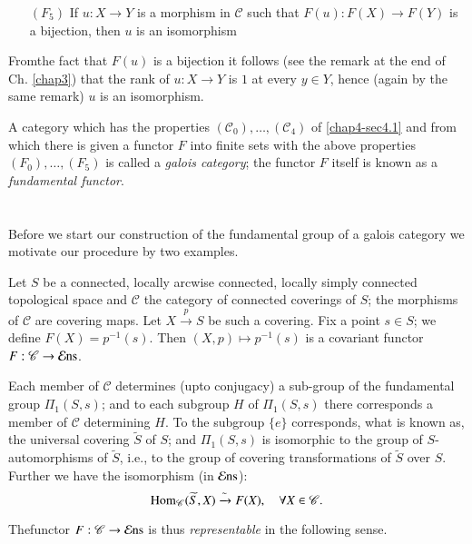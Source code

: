 \begin{itemize}
\item[$(F_{5})$] If $u:X\to Y$ is a morphism in $\mathscr{C}$ such
  that $F(u):F(X)\to F(Y)$ is a bijection, then $u$ is an isomorphism
\end{itemize}

From\pageoriginale the fact that $F(u)$ is a bijection it follows (see
the remark at the end of Ch. \ref{chap3}) that the rank of $u:X\to Y$ is $1$
at every $y\in Y$, hence (again by the same remark) $u$ is an
isomorphism.

A category which has the properties
$(\mathscr{C}_{0}),\ldots,(\mathscr{C}_{4})$ of \ref{chap4-sec4.1} and from
which there is given a functor $F$ into finite sets with the above
properties $(F_{0}),\ldots, (F_{5})$ is called a {\em galois
  category}; the functor $F$ itself is known as a {\em fundamental
  functor}. 

\section{}\label{chap4-sec4.3}
Before we start our construction of the fundamental group of a galois
category we motivate our procedure by two examples.

\begin{exam}\label{chap4-exam1}
Let $S$ be a connected, locally arcwise connected, locally simply
connected topological space and $\mathscr{C}$ the category of
connected coverings of $S$; the morphisms of $\mathscr{C}$ are
covering maps. Let $X\xrightarrow{p}S$ be such a covering. Fix a point
$s\in S$; we define $F(X)=p^{-1}(s)$. Then $(X,p)\mapsto p^{-1}(s)$ is
a covariant functor $F:\mathscr{C}\to \operatorname{\mathcal{E}ns}$.
\end{exam}

Each member of $\mathscr{C}$ determines (upto conjugacy) a sub-group
of the fundamental group $\Pi_{1}(S,s)$; and to each subgroup $H$ of
$\Pi_{1}(S,s)$ there corresponds a member of $\mathscr{C}$
determining $H$. To the subgroup $\{e\}$ corresponds, what is known
as, the universal covering $\widetilde{S}$ of $S$; and $\Pi_{1}(S,s)$
is isomorphic to the group of $S$-automorphisms of $\widetilde{S}$,
i.e., to the group of covering transformations of $\widetilde{S}$ over
$S$. Further we have the isomorphism (in $\operatorname{\mathcal{E}ns}$):
$$
\operatorname{Hom}_{\mathscr{C}}(\widetilde{S},X)\xrightarrow{\sim}F(X),\quad
\forall X\in \mathscr{C}. 
$$

The\pageoriginale functor $F:\mathscr{C}\to \operatorname{\mathcal{E}ns}$ is thus {\em
  representable} in the following sense.


